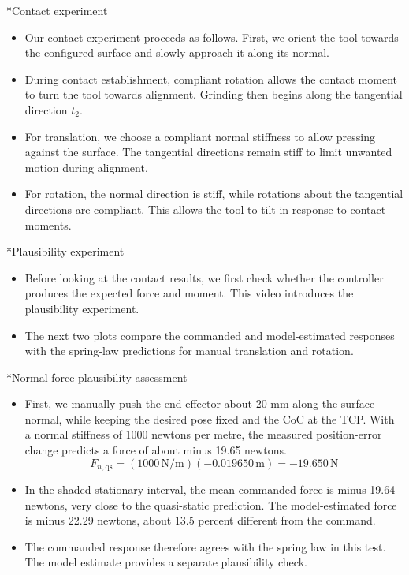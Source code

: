 \documentclass[12pt,a4paper]{article}
\makeatletter
\renewcommand\section{\@startsection{section}{1}{0pt}{14pt}{6pt}{\normalfont\Large\bfseries\color{navy}}}
\makeatother
\begin{document}
\section*{Contact experiment}
\begin{itemize}
\item Our contact experiment proceeds as follows. First, we orient the tool towards the configured surface and slowly approach it along its normal.
\item During contact establishment, compliant rotation allows the contact moment to turn the tool towards alignment. Grinding then begins along the tangential direction \(t_2\).
\item For translation, we choose a compliant normal stiffness to allow pressing against the surface. The tangential directions remain stiff to limit unwanted motion during alignment.
\item For rotation, the normal direction is stiff, while rotations about the tangential directions are compliant. This allows the tool to tilt in response to contact moments.
\end{itemize}

\section*{Plausibility experiment}
\begin{itemize}
\item Before looking at the contact results, we first check whether the controller produces the expected force and moment. This video introduces the plausibility experiment.
\item The next two plots compare the commanded and model-estimated responses with the spring-law predictions for manual translation and rotation.
\end{itemize}

\section*{Normal-force plausibility assessment}
\begin{itemize}
\item First, we manually push the end effector about 20 mm along the surface normal, while keeping the desired pose fixed and the CoC at the TCP. With a normal stiffness of 1000 newtons per metre, the measured position-error change predicts a force of about minus 19.65 newtons.
\[
F_{n,\mathrm{qs}}=(1000\,\mathrm{N/m})(-0.019650\,\mathrm{m})=-19.650\,\mathrm{N}
\]
\item In the shaded stationary interval, the mean commanded force is minus 19.64 newtons, very close to the quasi-static prediction. The model-estimated force is minus 22.29 newtons, about 13.5 percent different from the command.
\item The commanded response therefore agrees with the spring law in this test. The model estimate provides a separate plausibility check.
\end{itemize}
\end{document}
